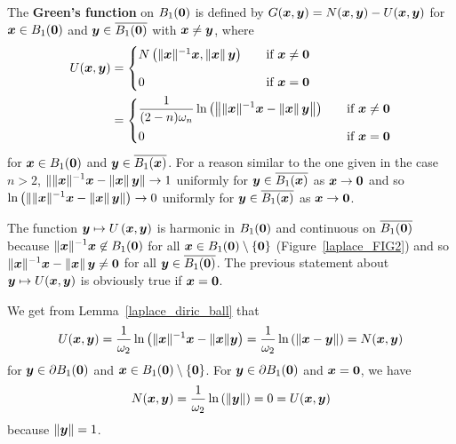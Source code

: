 The {\bfseries Green's function} on $B_1({\bm{0}})$ is
defined by $G({\bm{x}},{\bm{y}}) = N({\bm{x}},{\bm{y}}) - U({\bm{x}},{\bm{y}})$
for ${\bm{x}} \in B_1({\bm{0}})$ and ${\bm{y}} \in \overline{B_1({\bm{0}})}$ with
${\bm{x}} \neq {\bm{y}}$, where
\begin{align*}
U({\bm{x}},{\bm{y}}) &=
\begin{cases}
N\left(\|{\bm{x}}\|^{-1} {\bm{x}},\|{\bm{x}}\|\,{\bm{y}}\right) &
\quad \text{if} \ {\bm{x}} \neq {\bm{0}} \\[0.8em]
0 & \quad \text{if} \ {\bm{x}} = {\bm{0}}
\end{cases} \\
&= \begin{cases}
\displaystyle \frac{1}{(2-n)\omega_n}
\ln\left( \left\| \|{\bm{x}}\|^{-1}{\bm{x}} - \|{\bm{x}}\|\,{\bm{y}}\right\|\right)
& \quad \text{if} \ {\bm{x}} \neq {\bm{0}} \\[0.8em]
0 & \quad \text{if} \ {\bm{x}} = {\bm{0}}
\end{cases}
\end{align*}
for ${\bm{x}} \in B_1({\bm{0}})$ and ${\bm{y}} \in \overline{B_1({\bm{x}})}$.
For a reason similar to the one given in the case $n>2$,
$\displaystyle
\| \|{\bm{x}}\|^{-1} {\bm{x}}- \|{\bm{x}}\|\,{\bm{y}} \| \rightarrow 1$
uniformly for ${\bm{y}} \in \overline{B_1({\bm{x}})}$ as
${\bm{x}} \rightarrow {\bm{0}}$ and so $\displaystyle
\ln\left(\| \|{\bm{x}}\|^{-1} {\bm{x}}- \|{\bm{x}}\|\, {\bm{y}} \|\right)
\rightarrow 0$ uniformly for ${\bm{y}} \in \overline{B_1({\bm{x}})}$
as ${\bm{x}} \rightarrow {\bm{0}}$.

The function ${\bm{y}} \mapsto U\left({\bm{x}},{\bm{y}}\right)$
is harmonic in $B_1({\bm{0}})$ and
continuous on $\overline{B_1({\bm{0}})}$ because
$\displaystyle \|{\bm{x}}\|^{-1}{\bm{x}} \not\in B_1({\bm{0}})$ for all
${\bm{x}} \in B_1({\bm{0}})\setminus \{{\bm{0}}\}$
(Figure~\ref{laplace_FIG2}) and so
$\displaystyle \|{\bm{x}}\|^{-1}{\bm{x}} -\|{\bm{x}}\|\,{\bm{y}} \neq {\bm{0}}$
for all ${\bm{y}} \in \overline{B_1({\bm{0}})}$.
The previous statement about
${\bm{y}} \mapsto U({\bm{x}},{\bm{y}})$ is obviously true
if ${\bm{x}} = {\bm{0}}$.

We get from Lemma~\ref{laplace_diric_ball} that
\[
U({\bm{x}},{\bm{y}}) = \frac{1}{\omega_2}
\ln \left( \|{\bm{x}}\|^{-1}{\bm{x}} - \|{\bm{x}}\|{\bm{y}}\right)
= \frac{1}{\omega_2} \ln \left( \|{\bm{x}} - {\bm{y}}\| \right)
= N({\bm{x}},{\bm{y}})
\]
for ${\bm{y}} \in \partial B_1({\bm{0}})$ and
${\bm{x}} \in B_1({\bm{0}})\setminus \{{\bm{0}}\}$.  For
${\bm{y}} \in \partial B_1({\bm{0}})$ and ${\bm{x}} = {\bm{0}}$, we have
\[
N({\bm{x}},{\bm{y}}) = \frac{1}{\omega_2} \ln \left(\|{\bm{y}}\|\right)
= 0 = U({\bm{x}},{\bm{y}})
\]
because $\|{\bm{y}}\|=1$.

